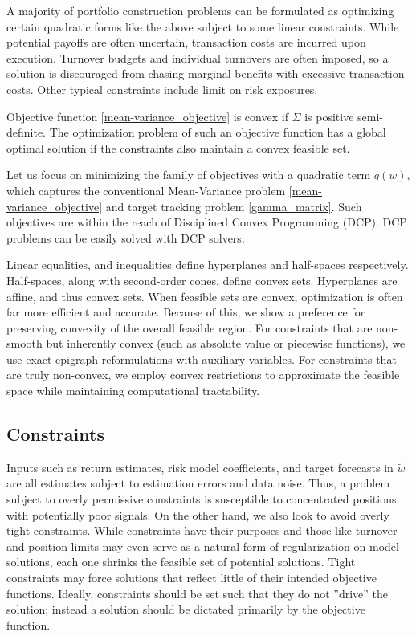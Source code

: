 \documentclass[11pt, letterpaper]{article}
\begin{document}
A majority of portfolio construction problems can be formulated as optimizing certain quadratic forms like the above subject to
some linear constraints. While potential payoffs are often uncertain, transaction costs are incurred upon execution. Turnover
budgets and individual turnovers are often imposed, so a solution is discouraged from chasing marginal benefits with excessive
transaction costs. Other typical constraints include limit on risk exposures.

Objective function \eqref{mean-variance_objective} is convex if $\Sigma$ is positive semi-definite. The optimization problem of
such an objective function has a global optimal solution if the constraints also maintain a convex feasible set.

Let us focus on minimizing the family of objectives with a quadratic term $q(w)$, which captures the conventional Mean-Variance
problem \eqref{mean-variance_objective} and target tracking problem \eqref{gamma_matrix}. Such objectives are within the reach
of Disciplined Convex Programming (DCP). DCP problems can be easily solved with DCP solvers.

Linear equalities, and inequalities define hyperplanes and half-spaces respectively. Half-spaces, along with second-order cones,
define convex sets. Hyperplanes are affine, and thus convex sets. When feasible sets are convex, optimization is often far more
efficient and accurate. Because of this, we show a preference for preserving convexity of the overall feasible region. For
constraints that are non-smooth but inherently convex (such as absolute value or piecewise functions), we use exact epigraph
reformulations with auxiliary variables. For constraints that are truly non-convex, we employ convex restrictions to approximate
the feasible space while maintaining computational tractability.

\subsection{Constraints}
Inputs such as return estimates, risk model coefficients, and target forecasts in $\tilde{w}$ are all estimates subject to
estimation errors and data noise. Thus, a problem subject to overly permissive constraints is susceptible to concentrated
positions with potentially poor signals. On the other hand, we also look to avoid overly tight constraints. While constraints
have their purposes and those like turnover and position limits may even serve as a natural form of regularization on model
solutions, each one shrinks the feasible set of potential solutions. Tight constraints may force solutions that reflect little
of their intended objective functions. Ideally, constraints should be set such that they do not ''drive'' the solution; instead a
solution should be dictated primarily by the objective function.
\end{document}
